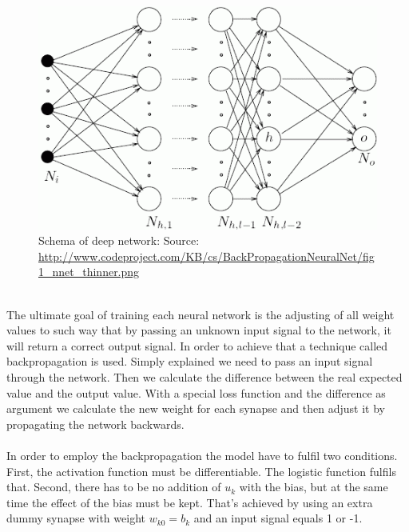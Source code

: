 \documentclass[runningheads,a4paper]{llncs}[2015/06/24]
\begin{document}
\begin{figure}[h]
\centering
\includegraphics[width=\textwidth]{deepNetwork}
\caption{Schema of deep network: Source: \url{http://www.codeproject.com/KB/cs/BackPropagationNeuralNet/fig1_nnet_thinner.png}}
\label{fig:deepNetwork}
\end{figure}  
  
\hspace{1cm}\\ The ultimate goal of training each neural network is the adjusting of all weight values to such way that by passing an unknown input signal to the network, it will return a correct output signal. In order to achieve that a technique called backpropagation is used. Simply explained we need to pass an input signal through the network. Then we calculate the difference between the real expected value and the output value. With a special loss function and the difference as argument we calculate the new weight for each synapse and then adjust it by propagating the network backwards\cite{rumelhart1986learning}.\\\\ In order to employ the backpropagation the model have to fulfil two conditions. First, the activation function must be differentiable. The logistic function fulfils that. Second, there has to be no addition of $u_k$ with the bias, but at the same time the effect of the bias must be kept. That's achieved by using an extra dummy synapse with weight $w_{k0} = b_k$ and an input signal equals 1 or -1\cite{haykin2009neural}.
\end{document}

